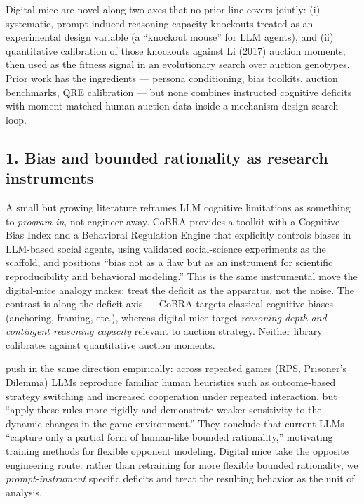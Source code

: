 Digital mice are novel along two axes that no prior line covers
jointly: (i) systematic, prompt-induced reasoning-capacity knockouts
treated as an experimental design variable (a ``knockout mouse'' for
LLM agents), and (ii) quantitative calibration of those knockouts
against Li (2017) auction moments, then used as the fitness signal in
an evolutionary search over auction genotypes. Prior work has the
ingredients --- persona conditioning, bias toolkits, auction
benchmarks, QRE calibration --- but none combines instructed
cognitive deficits with moment-matched human auction data inside a
mechanism-design search loop.

\subsection*{1. Bias and bounded rationality as research instruments}

A small but growing literature reframes LLM cognitive limitations as
something to \emph{program in}, not engineer away. CoBRA
\citep{cobra2025} provides a toolkit with a Cognitive Bias Index and a
Behavioral Regulation Engine that explicitly controls biases in
LLM-based social agents, using validated social-science experiments
as the scaffold, and positions ``bias not as a flaw but as an
instrument for scientific reproducibility and behavioral modeling.''
This is the same instrumental move the digital-mice analogy makes:
treat the deficit as the apparatus, not the noise. The contrast is
along the deficit axis --- CoBRA targets classical cognitive biases
(anchoring, framing, etc.), whereas digital mice target
\emph{reasoning depth and contingent reasoning capacity} relevant to
auction strategy. Neither library calibrates against quantitative
auction moments.

\citet{zheng2025bounded} push in the same direction empirically:
across repeated games (RPS, Prisoner's Dilemma) LLMs reproduce
familiar human heuristics such as outcome-based strategy switching
and increased cooperation under repeated interaction, but ``apply
these rules more rigidly and demonstrate weaker sensitivity to the
dynamic changes in the game environment.'' They conclude that current
LLMs ``capture only a partial form of human-like bounded
rationality,'' motivating training methods for flexible opponent
modeling. Digital mice take the opposite engineering route: rather
than retraining for more flexible bounded rationality, we
\emph{prompt-instrument} specific deficits and treat the resulting
behavior as the unit of analysis.

